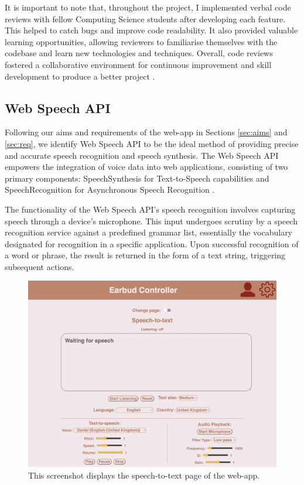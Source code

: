 \documentclass{l4proj}
\begin{document}
It is important to note that, throughout the project, I implemented verbal code reviews with fellow Computing Science students after developing each feature. This helped to catch bugs and improve code readability. It also provided valuable learning opportunities, allowing reviewers to familiarise themselves with the codebase and learn new technologies and techniques. Overall, code reviews fostered a collaborative environment for continuous improvement and skill development to produce a better project \citep{Atlassian}.

\subsection{Web Speech API}
\label{sec:web-speech-API}

Following our aims and requirements of the web-app in Sections \ref{sec:aims} and \ref{sec:req}, we identify Web Speech API to be the ideal method of providing precise and accurate speech recognition and speech synthesis. The Web Speech API empowers the integration of voice data into web applications, consisting of two primary components: SpeechSynthesis for Text-to-Speech capabilities and SpeechRecognition for Asynchronous Speech Recognition \citep{MozDevNet_2023}. 

The functionality of the Web Speech API's speech recognition involves capturing speech through a device's microphone. This input undergoes scrutiny by a speech recognition service against a predefined grammar list, essentially the vocabulary designated for recognition in a specific application. Upon successful recognition of a word or phrase, the result is returned in the form of a text string, triggering subsequent actions.

\begin{figure}
    \centering
    \includegraphics[width=0.85\linewidth]{dissertation/images/captions.jpeg}   
    \caption{This screenshot displays the speech-to-text page of the web-app.}
    \label{fig:captions} 
\end{figure}
\end{document}
